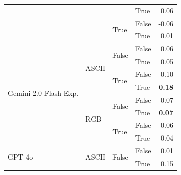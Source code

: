 \documentclass{article}
\begin{document}
\begin{table}
\begin{center}
{\begin{tabular}{@{}llllr@{}}
                                                                        &                           &                           & True                      & 0.06 \\
                                                                        &                           & \multirow[c]{2}{*}{True}  & False                     & -0.06 \\
                                                                        &                           &                           & True                      & 0.01 \\
    \midrule
    \multirow[c]{8}{*}{Gemini 2.0 Flash Exp.}                           & \multirow[c]{4}{*}{ASCII} & \multirow[c]{2}{*}{False} & False                     & 0.06 \\
                                                                        &                           &                           & True                      & 0.05 \\
                                                                        &                           & \multirow[c]{2}{*}{True}  & False                     & 0.10 \\
                                                                        &                           &                           & True                      & \textbf{0.18} \\
    \cmidrule{2-5}
                                                                        & \multirow[c]{4}{*}{RGB}   & \multirow[c]{2}{*}{False} & False                     & -0.07 \\
                                                                        &                           &                           & True                      & \textbf{0.07} \\
                                                                        &                           & \multirow[c]{2}{*}{True}  & False                     & 0.06 \\
                                                                        &                           &                           & True                      & 0.04 \\
    \midrule
    \multirow[c]{8}{*}{GPT-4o}                                          & \multirow[c]{4}{*}{ASCII} & \multirow[c]{2}{*}{False} & False                     & 0.01 \\
                                                                        &                           &                           & True                      & 0.15 \\

\end{tabular}}
\end{center}
\end{table}
\end{document}

